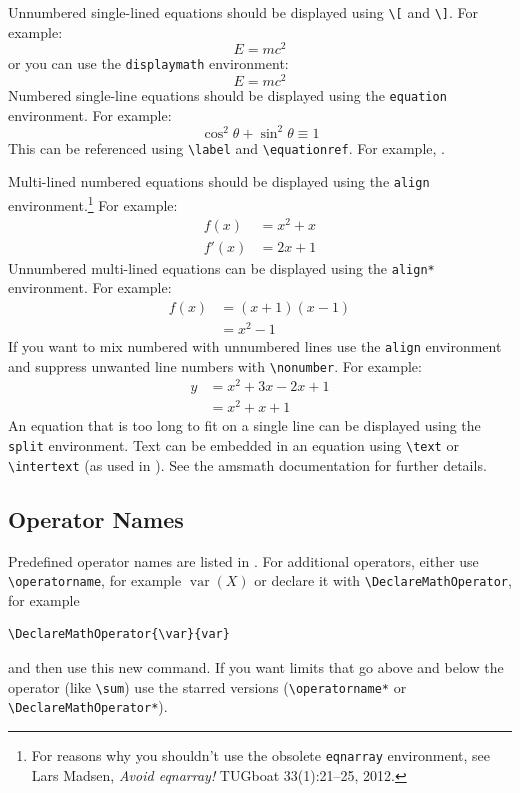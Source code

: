 \documentclass[pmlr,twocolumn,10pt]{jmlr} %
\begin{document}
Unnumbered single-lined equations should be displayed using
\verb|\[| and \verb|\]|. For example:
\[E = m c^2\]
or you can use the \texttt{displaymath} environment:
\begin{displaymath}
E = m c^2
\end{displaymath}
Numbered single-line equations should be displayed using the
\texttt{equation} environment. For example:
\begin{equation}\label{eq:trigrule}
\cos^2\theta + \sin^2\theta \equiv 1
\end{equation}
This can be referenced using \verb|\label| and \verb|\equationref|.
For example, .

Multi-lined numbered equations should be displayed using the
\texttt{align} environment.\footnote{For reasons why you 
shouldn't use the obsolete \texttt{eqnarray} environment, see
Lars Madsen, \emph{Avoid eqnarray!} TUGboat 33(1):21--25, 2012.} For example:
\begin{align}
f(x) &= x^2 + x\label{eq:f}\\
f'(x) &= 2x + 1\label{eq:df}
\end{align}
Unnumbered multi-lined equations can be displayed using the
\texttt{align*} environment. For example:
\begin{align*}
f(x) &= (x+1)(x-1)\\
&= x^2 - 1
\end{align*}
If you want to mix numbered with unnumbered lines use the
\texttt{align} environment and suppress unwanted line numbers with
\verb|\nonumber|. For example:
\begin{align}
y &= x^2 + 3x - 2x + 1\nonumber\\
&= x^2 + x + 1\label{eq:y}
\end{align}
An equation that is too long to fit on a single line can be
displayed using the \texttt{split} environment. 
Text can be embedded in an equation using \verb|\text| or
\verb|\intertext| (as used in ).
See the \textsf{amsmath} documentation for further details.

\subsection{Operator Names}
\label{sec:op}

Predefined operator names are listed in .
For additional operators, either use \verb|\operatorname|,
for example $\operatorname{var}(X)$ or declare it with
\verb|\DeclareMathOperator|, for example
\begin{verbatim}
\DeclareMathOperator{\var}{var}
\end{verbatim}
and then use this new command. If you want limits that go above and
below the operator (like \verb|\sum|) use the starred versions
(\verb|\operatorname*| or \verb|\DeclareMathOperator*|).
\end{document}
